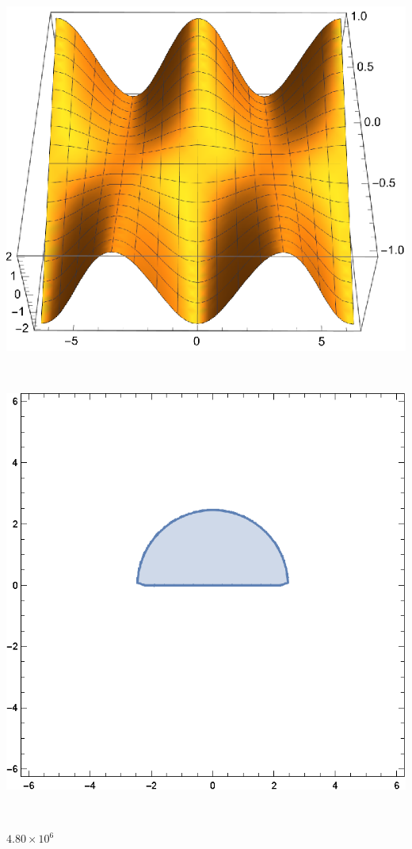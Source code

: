 \documentclass{article}
\begin{document}
\(\)

\includegraphics{WLG_gr9.eps}

\(\)

\includegraphics{WLG_gr10.eps}

\(\)

\begin{doublespace}
\noindent\(4.80\times 10^6\)
\end{doublespace}
\end{document}
